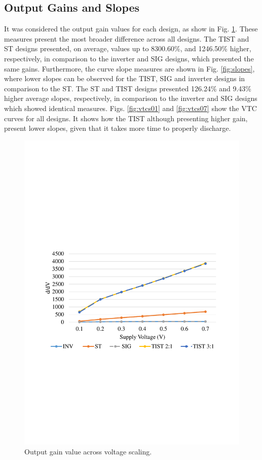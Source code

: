 \documentclass[pgmicro,mestrado,english]{iiufrgs}
\begin{document}
\subsection{Output Gains and Slopes}
    
It was considered the output gain values for each design, as show in Fig. \ref{figsGainComp}. These measures present the most broader difference across all designs. The TIST and ST designs presented, on average, values up to 8300.60\%, and 1246.50\% higher, respectively, in comparison to the inverter and SIG designs, which presented the same gains. Furthermore, the curve slope measures are shown in Fig. \ref{fig:slopes}, where lower slopes can be observed for the TIST, SIG and inverter designs in comparison to the ST. The ST and TIST designs presented 126.24\% and 9.43\% higher average slopes, respectively, in comparison to the inverter and SIG designs which showed identical measures. Figs. \ref{fig:vtcs01} and \ref{fig:vtcs07} show the VTC curves for all designs. It shows how the TIST although presenting higher gain, present lower slopes, given that it takes more time to properly discharge.

    \begin{figure}[]
        \centering
            \includegraphics[width=1\textwidth, trim={1.25cm 9cm 2cm 10cm}, clip]{gainComp.pdf}
            \caption{Output gain value across voltage scaling.}
        \label{figsGainComp}
    \end{figure}
\end{document}
